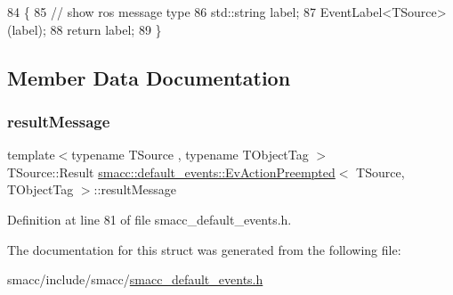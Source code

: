 \begin{DoxyCode}
84   \{
85     \textcolor{comment}{// show ros message type}
86     std::string label;
87     EventLabel<TSource>(label);
88     \textcolor{keywordflow}{return} label;
89   \}
\end{DoxyCode}


\subsection{Member Data Documentation}
\mbox{\label{structsmacc_1_1default__events_1_1EvActionPreempted_a38f3c09c9c672b82b08ea5ff2085280e}} 
\subsubsection{\texorpdfstring{result\+Message}{resultMessage}}
{\footnotesize\ttfamily template$<$typename T\+Source , typename T\+Object\+Tag $>$ \\
T\+Source\+::\+Result \hyperlink{structsmacc_1_1default__events_1_1EvActionPreempted}{smacc\+::default\+\_\+events\+::\+Ev\+Action\+Preempted}$<$ T\+Source, T\+Object\+Tag $>$\+::result\+Message}



Definition at line 81 of file smacc\+\_\+default\+\_\+events.\+h.



The documentation for this struct was generated from the following file\+:\begin{DoxyCompactItemize}
\item 
smacc/include/smacc/\hyperlink{smacc__default__events_8h}{smacc\+\_\+default\+\_\+events.\+h}\end{DoxyCompactItemize}
